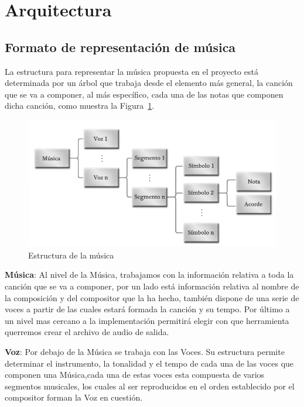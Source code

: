 \section{Arquitectura}

\subsection{Formato de representación de música}


La estructura para representar la música propuesta en el proyecto está determinada por un árbol que trabaja desde el elemento más general, la canción que se va a componer, al más específico, cada una de las notas que componen dicha canción, como muestra la Figura~\ref{fig:structmusic}.\\
	
	\begin{figure}[htbp]
	\centering
	\hspace*{-0.67in}
	\includegraphics[scale=0.57]{graphics/musica-estructura.png}
	\caption{Estructura de la música}
	\label{fig:structmusic}
	\end{figure}


\textbf{Música}: Al nivel de la Música, trabajamos con la información relativa a toda la canción que se va a componer, por un lado está información relativa al nombre de la composición y del compositor que la ha hecho, también dispone de una serie de voces a partir de las cuales estará formada la canción y su tempo. Por último a un nivel mas cercano a la implementación permitirá elegir con que herramienta querremos crear el archivo de audio de salida.
\newline

\textbf{Voz}: Por debajo de la Música se trabaja con las Voces. Su estructura permite determinar el instrumento, la tonalidad y el tempo de cada una de las voces que componen una Música,cada una de estas voces esta compuesta de varios segmentos musicales, los cuales al ser reproducidos en el orden establecido por el compositor forman la Voz en cuestión.
\newline


